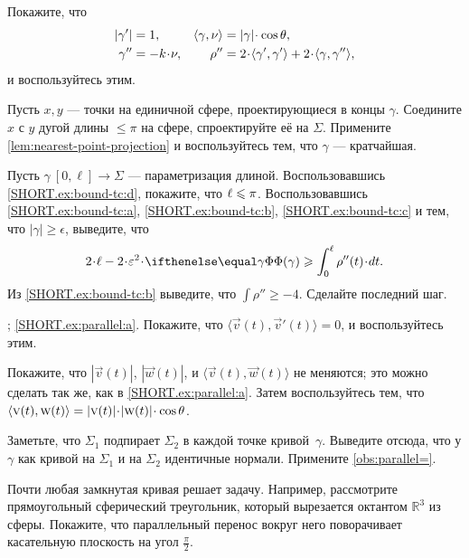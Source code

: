 Покажите, что
\begin{align*}
|\gamma'|&=1,
&
\langle\gamma,\Norm\rangle&=|\gamma|\cdot\cos\theta,
\\
\gamma''&=-k\cdot \Norm,
&
\rho''&=2\cdot \langle\gamma',\gamma'\rangle+2\cdot \langle\gamma,\gamma''\rangle,
\end{align*}
и воспользуйтесь этим.

Пусть $x,y$ --- точки на единичной сфере, проектирующиеся в концы $\gamma$. 
Соедините $x$ с $y$ дугой длины $\le \pi$ на сфере, спроектируйте её на $\Sigma$.
Примените \ref{lem:nearest-point-projection} и воспользуйтесь тем, что $\gamma$ --- кратчайшая.

Пусть $\gamma\:[0,\ell]\to\Sigma$ --- параметризация длиной.
Воспользовавшись \ref{SHORT.ex:bound-tc:d}, покажите, что $\ell\z\le \pi$.
Воспользовавшись \ref{SHORT.ex:bound-tc:a}, \ref{SHORT.ex:bound-tc:b}, \ref{SHORT.ex:bound-tc:c} и тем, что $|\gamma|\ge \epsilon$, выведите, что 
\[2\cdot \ell-2\cdot \epsilon^2\cdot \tc{\gamma}
\ge
\int_0^\ell\rho''(t)\cdot dt.\]
Из \ref{SHORT.ex:bound-tc:b} выведите, что $\int\rho''\ge -4$.
Сделайте последний шаг.

 
\setcounter{eqtn}{0}

\parbf{\ref{ex:parallel}}; \ref{SHORT.ex:parallel:a}.
Покажите, что $\langle\vec v(t),\vec v'(t)\rangle=0$, и воспользуйтесь этим.

\parit{\ref{SHORT.ex:parallel:b}}
Покажите, что $|\vec v(t)|$, $|\vec w(t)|$, и
$\langle\vec v(t),\vec w(t)\rangle$
не меняются; это можно сделать так же, как в \ref{SHORT.ex:parallel:a}.
Затем воспользуйтесь тем, что 
$\langle\vec v(t),\vec w(t)\rangle\z=|\vec v(t)|\cdot|\vec w(t)|\cdot\cos\theta$.

Заметьте, что $\Sigma_1$ подпирает $\Sigma_2$ в каждой точке кривой~$\gamma$.
Выведите отсюда, что у $\gamma$ как кривой на $\Sigma_1$ и на $\Sigma_2$ идентичные нормали.
Примените \ref{obs:parallel=}.

Почти любая замкнутая кривая решает задачу.
Например, рассмотрите прямоугольный сферический треугольник, который вырезается октантом $\mathbb{R}^3$ из сферы.
Покажите, что параллельный перенос вокруг него поворачивает касательную плоскость на угол $\tfrac\pi 2$.

